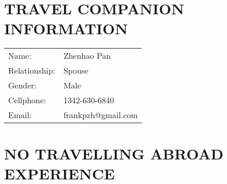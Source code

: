 \documentclass[11pt]{res} %
\begin{document}
\begin{resume}
\section{TRAVEL COMPANION INFORMATION}
\vspace{4pt}
\begin{tabular}{ll}
Name: & Zhenhao Pan \\
Relationship: & Spouse \\
Gender: & Male \\
Cellphone: & 1342-630-6840 \\
Email: & frankpzh@gmail.com
\end{tabular}

\section{NO TRAVELLING ABROAD EXPERIENCE}

\end{resume}
\end{document}
